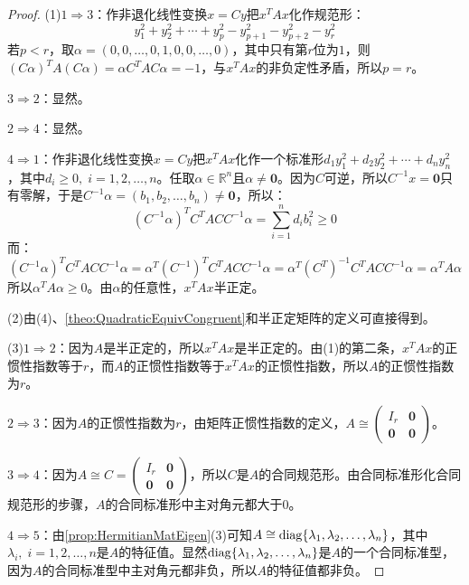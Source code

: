 \begin{proof}
	(1)$1\Rightarrow3$：作非退化线性变换$x=Cy$把$x^TAx$化作规范形：
	\begin{equation*}
		y_1^2+y_2^2+\cdots+y_p^2-y_{p+1}^2-y_{p+2}^2-y_r^2
	\end{equation*}
	若$p<r$，取$\alpha=(0,0,\dots,0,1,0,0,\dots,0)$，其中只有第$r$位为$1$，则$(C\alpha)^TA(C\alpha)=\alpha C^TAC\alpha=-1$，与$x^TAx$的非负定性矛盾，所以$p=r$。\par
	$3\Rightarrow2$：显然。\par
	$2\Rightarrow4$：显然。\par
	$4\Rightarrow1$：作非退化线性变换$x=Cy$把$x^TAx$化作一个标准形$d_1y_1^2+d_2y_2^2+\cdots+d_ny_n^2$，其中$d_i\geqslant0,\;i=1,2,\dots,n$。任取$\alpha\in\mathbb{R}^{n}$且$\alpha\ne\mathbf{0}$。因为$C$可逆，所以$C^{-1}x=\mathbf{0}$只有零解，于是$C^{-1}\alpha=(b_1,b_2,\dots,b_n)\ne\mathbf{0}$，所以：
	\begin{equation*}
		(C^{-1}\alpha)^TC^TACC^{-1}\alpha=\sum_{i=1}^{n}d_ib_i^2\geqslant0
	\end{equation*}
	而：
	\begin{equation*}
		(C^{-1}\alpha)^TC^TACC^{-1}\alpha=\alpha^T(C^{-1})^TC^TACC^{-1}\alpha=\alpha^T(C^T)^{-1}C^TACC^{-1}\alpha=\alpha^TA\alpha 
	\end{equation*}
	所以$\alpha^TA\alpha\geqslant0$。由$\alpha$的任意性，$x^TAx$半正定。\par
	(2)由(4)、\cref{theo:QuadraticEquivCongruent}和半正定矩阵的定义可直接得到。\par	
	(3)$1\Rightarrow2$：因为$A$是半正定的，所以$x^TAx$是半正定的。由(1)的第二条，$x^TAx$的正惯性指数等于$r$，而$A$的正惯性指数等于$x^TAx$的正惯性指数，所以$A$的正惯性指数为$r$。\par
	$2\Rightarrow3$：因为$A$的正惯性指数为$r$，由矩阵正惯性指数的定义，$A\cong\begin{pmatrix}
		I_r & \mathbf{0} \\
		\mathbf{0} & \mathbf{0}
	\end{pmatrix}$。\par
	$3\Rightarrow4$：因为$A\cong C=
	\begin{pmatrix}
		I_r & \mathbf{0} \\
		\mathbf{0} & \mathbf{0}
	\end{pmatrix}$，所以$C$是$A$的合同规范形。由合同标准形化合同规范形的步骤，$A$的合同标准形中主对角元都大于$0$。\par
	$4\Rightarrow5$：由\cref{prop:HermitianMatEigen}(3)可知$A\cong\operatorname{diag}\{\lambda_1, \lambda_2, \dots, \lambda_{n}\}$，其中$\lambda_i,\;i=1,2,\dots,n$是$A$的特征值。显然$\operatorname{diag}\{\lambda_1, \lambda_2, \dots, \lambda_{n}\}$是$A$的一个合同标准型，因为$A$的合同标准型中主对角元都非负，所以$A$的特征值都非负。\par

\end{proof}
